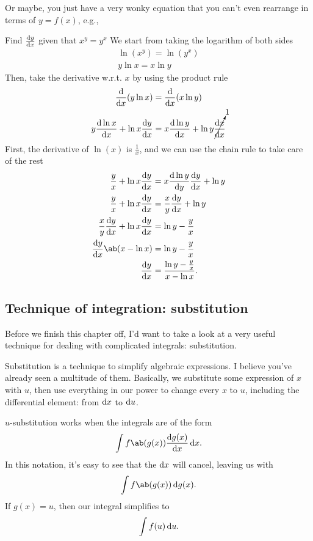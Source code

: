 Or maybe, you just have a very wonky equation that you can't even rearrange in terms of $y = f(x)$, e.g.,
\begin{exmp}{Find $\odv{y}{x}$ given that $x^y = y^x$}
  We start from taking the logarithm of both sides
  \begin{align}
    \ln(x^y) = \ln(y^x) \\
    y\ln x = x\ln y
  \end{align}
  Then, take the derivative w.r.t. $x$ by using the product rule
  \begin{align}
    \odv*{(y\ln x)}{x}                & = \odv*{(x\ln y)}{x}                              \\
    y\odv{\ln x}{x} + \ln x\odv{y}{x} & = x\odv{\ln y}{x} + \ln y\cancelto{1}{\odv{x}{x}}
  \end{align}
  First, the derivative of $\ln(x)$ is $\frac{1}{x}$, and we can use the chain rule to take care of the rest
  \begin{align}
    \frac{y}{x} + \ln x\odv{y}{x}           & = x\odv{\ln y}{y}\odv{y}{x} + \ln y       \\
    \frac{y}{x} + \ln x\odv{y}{x}           & = \frac{x}{y}\odv{y}{x} + \ln y           \\
    \frac{x}{y}\odv{y}{x} + \ln x\odv{y}{x} & = \ln y - \frac{y}{x}                     \\
    \odv{y}{x}\ab(x - \ln x)                & = \ln y - \frac{y}{x}                     \\
    \odv{y}{x}                              & = \frac{\ln y - \frac{y}{x}}{x - \ln x}.
  \end{align}
\end{exmp}


\subsection{Technique of integration: substitution}
\label{sec:u-substitution}

Before we finish this chapter off, I'd want to take a look at a very useful technique for dealing with complicated integrals: substitution.

Substitution is a technique to simplify algebraic expressions. I believe you've already seen a multitude of them. Basically, we substitute some expression of $x$ with $u$, then use everything in our power to change every $x$ to $u$, including the differential element: from $\odif{x}$ to $\odif{u}$.

$u$-substitution works when the integrals are of the form
\begin{equation}
  \int f\ab(g(x))\odv{g(x)}{x}\odif{x}.
\end{equation}
In this notation, it's easy to see that the $\odif{x}$ will cancel, leaving us with
\begin{equation}
  \int f\ab(g(x))\odif{g(x)}.
\end{equation}
If $g(x) = u$, then our integral simplifies to
\begin{equation}
  \int f(u)\odif{u}.
\end{equation}

